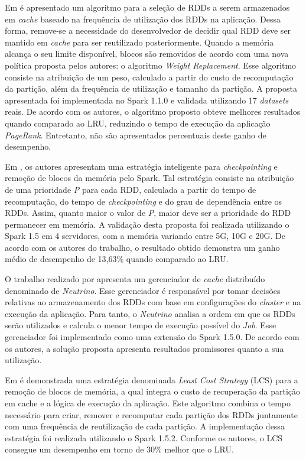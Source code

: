 Em \cite{duan2016selection} é  apresentado um algoritmo para a seleção de RDDs a serem armazenados em \textit{cache} baseado na frequência de utilização dos RDDs na aplicação. Dessa forma, remove-se a necessidade do desenvolvedor de decidir qual RDD deve ser mantido em \textit{cache} para ser reutilizado posteriormente. Quando a memória alcança o seu limite disponível, blocos são removidos de acordo com uma nova política proposta pelos autores: o algoritmo \textit{Weight Replacement}. Esse algoritmo consiste na atribuição de um peso, calculado a partir do custo de recomputação da partição, além da frequência de utilização e tamanho da partição. A proposta apresentada foi implementada no Spark 1.1.0 e validada utilizando 17 \textit{datasets} reais. De acordo com os autores, o algoritmo proposto obteve melhores resultados quando comparado ao LRU, reduzindo o tempo de execuçāo da aplicação \textit{PageRank}. Entretanto, não são apresentados percentuais deste ganho de desempenho. 

Em \cite{zhang2017intelligent}, os autores apresentam uma estratégia inteligente para \textit{checkpointing} e remoção de blocos da memória pelo Spark. Tal estratégia consiste na atribuição de uma prioridade \textit{P} para cada RDD, calculada a partir do tempo de recomputação, do tempo de \textit{checkpointing} e do grau de dependência entre os RDDs. Assim, quanto maior o valor de \textit{P}, maior deve ser a prioridade do RDD permanecer em memória. A validação desta proposta foi realizada utilizando o Spark 1.5 em 4 servidores, com a memória variando entre 5G, 10G e 20G. De acordo com os autores do trabalho, o resultado obtido demonstra um ganho médio de desempenho de 13,63\% quando comparado ao LRU.

O trabalho realizado por \cite{xu2016neutrino} apresenta um gerenciador de \textit{cache} distribuído denominado de \textit{Neutrino}. Esse gerenciador é responsável por tomar decisões relativas ao armazenamento dos RDDs com base em configurações do \textit{cluster} e na execução da aplicação. Para tanto, o \textit{Neutrino} analisa a ordem em que os RDDs serão utilizados e calcula o menor tempo de execução possível do \textit{Job}. Esse gerenciador foi implementado como uma extensão do Spark 1.5.0. De acordo com os autores, a solução proposta apresenta resultados promissores quanto a sua utilização. 

Em \cite{geng2017lcs} é demonstrada uma estratégia denominada \textit{Least Cost Strategy} (LCS) para a remoção de blocos de memória, a qual integra o custo de recuperação da partição em cache e a lógica de execução da aplicação. Este algoritmo combina o tempo necessário para criar, remover e recomputar cada partição dos RDDs juntamente com uma frequência de reutilização de cada partição. A implementação dessa estratégia foi realizada utilizando o Spark 1.5.2. Conforme os autores, o LCS consegue um desempenho em torno de 30\% melhor que o LRU.


